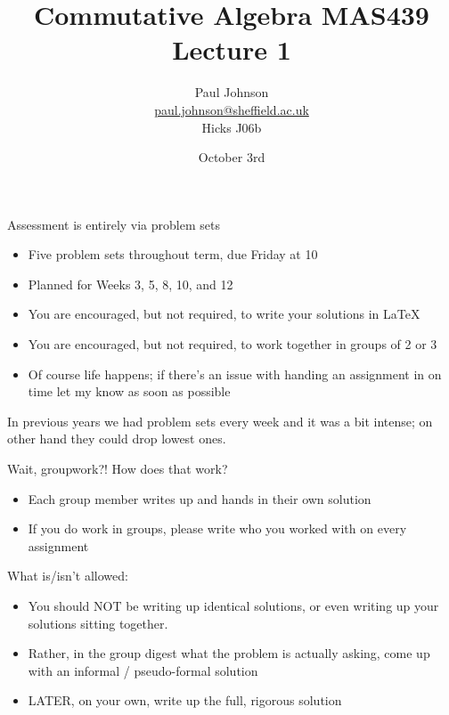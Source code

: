 \documentclass{beamer}
\title{Commutative Algebra MAS439 \\ Lecture 1}
\author{Paul Johnson \\ \href{mailto:paul.johnson@sheffield.ac.uk}{paul.johnson@sheffield.ac.uk} \\ Hicks J06b}
\date{October 3rd}
\begin{document}
\begin{frame}
\titlepage
\end{frame}


\begin{frame}{Assessment is entirely via problem sets}

\begin{itemize}
\item Five problem sets throughout term, due Friday at 10
\item Planned for Weeks 3, 5, 8, 10, and 12
\item You are encouraged, but not required, to write your solutions in \LaTeX
\item You are encouraged, but not required, to work together in groups of 2 or 3
\item Of course life happens; if there's an issue with handing an assignment in on time let my know as soon as possible
\end{itemize}

In previous years we had problem sets every week and it was a bit intense; on other hand they could drop lowest ones.

\end{frame}


\begin{frame}{Wait, groupwork?! How does that work?}

\begin{itemize}
\item Each group member writes up and hands in their own solution
\item If you do work in groups, please write who you worked with on every assignment
\end{itemize}

\begin{block}{What is/isn't allowed:}
\begin{itemize}
\item You should \alert{NOT} be writing up identical solutions, or even writing up your solutions sitting together.  
\item Rather, in the group digest what the problem is actually asking, come up with an informal / pseudo-formal solution
\item \alert{LATER}, on your own, write up the full, rigorous solution
\end{itemize}
\end{block}

\end{frame}
\end{document}
